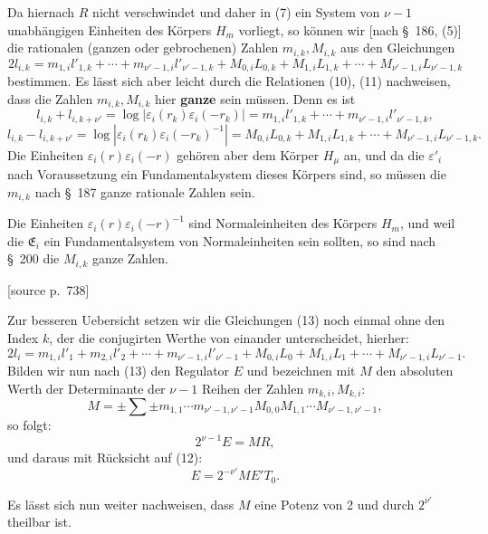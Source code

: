 \documentclass[11pt]{article}
\newcommand{\srcpage}[1]{\par\medskip\noindent\textsf{[source p.~#1]}\par\smallskip}
\begin{document}
Da hiernach $R$ nicht verschwindet und daher in (7) ein System von $\nu-1$ unabhängigen Einheiten des Körpers $H_m$ vorliegt, so können wir [nach \S~186, (5)] die rationalen (ganzen oder gebrochenen) Zahlen $m_{i,k},M_{i,k}$ aus den Gleichungen
\begin{equation}
2l_{i,k}=m_{1,i}l'_{1,k}+\cdots+m_{\nu'-1,i}l'_{\nu'-1,k}
+M_{0,i}L_{0,k}+M_{1,i}L_{1,k}+\cdots+M_{\nu'-1,i}L_{\nu'-1,k}
\tag{13}
\end{equation}
bestimmen. Es lässt sich aber leicht durch die Relationen (10), (11) nachweisen, dass die Zahlen $m_{i,k},M_{i,k}$ hier \textbf{ganze} sein müssen. Denn es ist
\[
l_{i,k}+l_{i,k+\nu'}=\log|\varepsilon_i(r_k)\varepsilon_i(-r_k)|
=m_{1,i}l'_{1,k}+\cdots+m_{\nu'-1,i}l'_{\nu'-1,k},
\]
\[
l_{i,k}-l_{i,k+\nu'}=\log|\varepsilon_i(r_k)\varepsilon_i(-r_k)^{-1}|
=M_{0,i}L_{0,k}+M_{1,i}L_{1,k}+\cdots+M_{\nu'-1,i}L_{\nu'-1,k}.
\]
Die Einheiten $\varepsilon_i(r)\varepsilon_i(-r)$ gehören aber dem Körper $H_\mu$ an, und da die $\varepsilon'_i$ nach Voraussetzung ein Fundamentalsystem dieses Körpers sind, so müssen die $m_{i,k}$ nach \S~187 ganze rationale Zahlen sein.

Die Einheiten $\varepsilon_i(r)\varepsilon_i(-r)^{-1}$ sind Normaleinheiten des Körpers $H_m$, und weil die $\mathfrak E_i$ ein Fundamentalsystem von Normaleinheiten sein sollten, so sind nach \S~200 die $M_{i,k}$ ganze Zahlen.

\srcpage{738}
Zur besseren Uebersicht setzen wir die Gleichungen (13) noch einmal ohne den Index $k$, der die conjugirten Werthe von einander unterscheidet, hierher:
\begin{equation}
2l_i=m_{1,i}l'_1+m_{2,i}l'_2+\cdots+m_{\nu'-1,i}l'_{\nu'-1}
+M_{0,i}L_0+M_{1,i}L_1+\cdots+M_{\nu'-1,i}L_{\nu'-1}.
\tag{14}
\end{equation}
Bilden wir nun nach (13) den Regulator $E$ und bezeichnen mit $M$ den absoluten Werth der Determinante der $\nu-1$ Reihen der Zahlen $m_{k,i},M_{k,i}$:
\[
M=\pm\sum\pm m_{1,1}\cdots m_{\nu'-1,\nu'-1}M_{0,0}M_{1,1}\cdots M_{\nu'-1,\nu'-1},
\]
so folgt:
\begin{equation}
2^{\nu-1}E=MR,
\tag{15}
\end{equation}
und daraus mit Rücksicht auf (12):
\begin{equation}
E=2^{-\nu'}ME'T_0.
\tag{16}
\end{equation}

Es lässt sich nun weiter nachweisen, dass $M$ eine Potenz von 2 und durch $2^{\nu'}$ theilbar ist.
\end{document}
